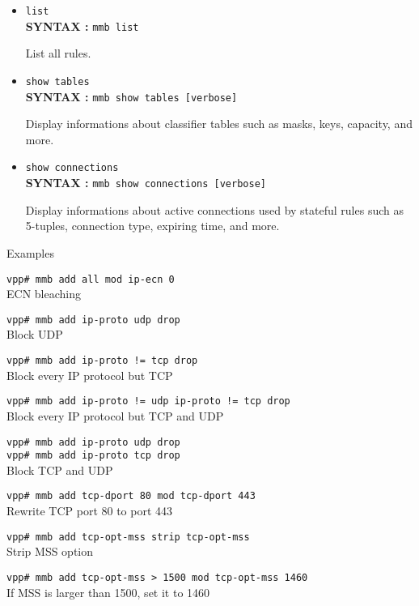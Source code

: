 \documentclass[a4paper,twoside,11pt]{report}
\makeatletter
\renewcommand{\chapter}{\@startsection{chapter}{0}{0mm}
  {\baselineskip}%
  {\baselineskip}{\clearpage\LARGE\bf\color{black}}}
\makeatother
\begin{document}
 \begin{itemize}
   \item \texttt{list}\\
         \textbf{SYNTAX :} \texttt{mmb list}

         List all rules.
   \item \texttt{show tables}\\
         \textbf{SYNTAX :} \texttt{mmb show tables [verbose]}

         Display informations about classifier tables such as masks, keys,
         capacity, and more.
   \item \texttt{show connections}\\
         \textbf{SYNTAX :} \texttt{mmb show connections [verbose]}

         Display informations about active connections used by stateful rules
         such as 5-tuples, connection type, expiring time, and more.
 \end{itemize}

\chapter{Examples}

\texttt{vpp\# mmb add all mod ip-ecn 0} \\
   ECN bleaching

\texttt{vpp\# mmb add ip-proto udp drop} \\
   Block UDP

\texttt{vpp\# mmb add ip-proto != tcp drop} \\
   Block every IP protocol but TCP

\texttt{vpp\# mmb add ip-proto != udp ip-proto != tcp drop} \\
   Block every IP protocol but TCP and UDP

\texttt{vpp\# mmb add ip-proto udp drop} \\
\texttt{vpp\# mmb add ip-proto tcp drop} \\
   Block TCP and UDP

\texttt{vpp\# mmb add tcp-dport 80 mod tcp-dport 443} \\
   Rewrite TCP port 80 to port 443

\texttt{vpp\# mmb add tcp-opt-mss strip tcp-opt-mss} \\
   Strip MSS option

\texttt{vpp\# mmb add tcp-opt-mss > 1500 mod tcp-opt-mss 1460} \\
   If MSS is larger than 1500, set it to 1460
\end{document}
